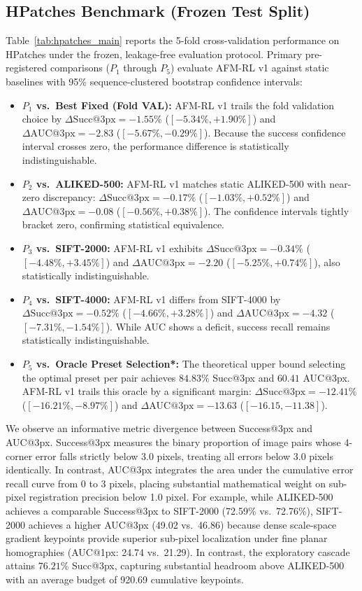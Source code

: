 \documentclass[conference]{IEEEtran}
\begin{document}
\subsection{HPatches Benchmark (Frozen Test Split)}
Table~\ref{tab:hpatches_main} reports the 5-fold cross-validation performance on HPatches under the frozen, leakage-free evaluation protocol. Primary pre-registered comparisons ($P_1$ through $P_5$) evaluate AFM-RL v1 against static baselines with 95\% sequence-clustered bootstrap confidence intervals:
\begin{itemize}
    \item \textbf{$P_1$ vs.\ Best Fixed (Fold VAL):} AFM-RL v1 trails the fold validation choice by $\Delta\text{Succ}@3\text{px} = -1.55\%$ ($[-5.34\%, +1.90\%]$) and $\Delta\text{AUC}@3\text{px} = -2.83$ ($[-5.67\%, -0.29\%]$). Because the success confidence interval crosses zero, the performance difference is statistically indistinguishable.
    \item \textbf{$P_2$ vs.\ ALIKED-500:} AFM-RL v1 matches static ALIKED-500 with near-zero discrepancy: $\Delta\text{Succ}@3\text{px} = -0.17\%$ ($[-1.03\%, +0.52\%]$) and $\Delta\text{AUC}@3\text{px} = -0.08$ ($[-0.56\%, +0.38\%]$). The confidence intervals tightly bracket zero, confirming statistical equivalence.
    \item \textbf{$P_3$ vs.\ SIFT-2000:} AFM-RL v1 exhibits $\Delta\text{Succ}@3\text{px} = -0.34\%$ ($[-4.48\%, +3.45\%]$) and $\Delta\text{AUC}@3\text{px} = -2.20$ ($[-5.25\%, +0.74\%]$), also statistically indistinguishable.
    \item \textbf{$P_4$ vs.\ SIFT-4000:} AFM-RL v1 differs from SIFT-4000 by $\Delta\text{Succ}@3\text{px} = -0.52\%$ ($[-4.66\%, +3.28\%]$) and $\Delta\text{AUC}@3\text{px} = -4.32$ ($[-7.31\%, -1.54\%]$). While AUC shows a deficit, success recall remains statistically indistinguishable.
    \item \textbf{$P_5$ vs.\ Oracle Preset Selection*:} The theoretical upper bound selecting the optimal preset per pair achieves $84.83\%$ Succ@3px and $60.41$ AUC@3px. AFM-RL v1 trails this oracle by a significant margin: $\Delta\text{Succ}@3\text{px} = -12.41\%$ ($[-16.21\%, -8.97\%]$) and $\Delta\text{AUC}@3\text{px} = -13.63$ ($[-16.15, -11.38]$).
\end{itemize}

We observe an informative metric divergence between Success@3px and AUC@3px. Success@3px measures the binary proportion of image pairs whose 4-corner error falls strictly below 3.0 pixels, treating all errors below 3.0 pixels identically. In contrast, AUC@3px integrates the area under the cumulative error recall curve from 0 to 3 pixels, placing substantial mathematical weight on sub-pixel registration precision below 1.0 pixel. For example, while ALIKED-500 achieves a comparable Success@3px to SIFT-2000 (72.59\% vs.\ 72.76\%), SIFT-2000 achieves a higher AUC@3px (49.02 vs.\ 46.86) because dense scale-space gradient keypoints provide superior sub-pixel localization under fine planar homographies (AUC@1px: 24.74 vs.\ 21.29). In contrast, the exploratory cascade attains $76.21\%$ Succ@3px, capturing substantial headroom above ALIKED-500 with an average budget of 920.69 cumulative keypoints.
\end{document}
